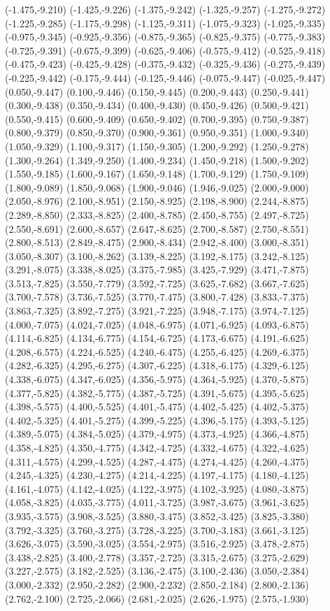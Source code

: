 (-1.475,-9.210) (-1.425,-9.226) (-1.375,-9.242) (-1.325,-9.257) (-1.275,-9.272) (-1.225,-9.285) (-1.175,-9.298) (-1.125,-9.311) (-1.075,-9.323) (-1.025,-9.335) (-0.975,-9.345) (-0.925,-9.356) (-0.875,-9.365) (-0.825,-9.375) (-0.775,-9.383) (-0.725,-9.391) (-0.675,-9.399) (-0.625,-9.406) (-0.575,-9.412) (-0.525,-9.418) (-0.475,-9.423) (-0.425,-9.428) (-0.375,-9.432) (-0.325,-9.436) (-0.275,-9.439) (-0.225,-9.442) (-0.175,-9.444) (-0.125,-9.446) (-0.075,-9.447) (-0.025,-9.447) (0.050,-9.447) (0.100,-9.446) (0.150,-9.445) (0.200,-9.443) (0.250,-9.441) (0.300,-9.438) (0.350,-9.434) (0.400,-9.430) (0.450,-9.426) (0.500,-9.421) (0.550,-9.415) (0.600,-9.409) (0.650,-9.402) (0.700,-9.395) (0.750,-9.387) (0.800,-9.379) (0.850,-9.370) (0.900,-9.361) (0.950,-9.351) (1.000,-9.340) (1.050,-9.329) (1.100,-9.317) (1.150,-9.305) (1.200,-9.292) (1.250,-9.278) (1.300,-9.264) (1.349,-9.250) (1.400,-9.234) (1.450,-9.218) (1.500,-9.202) (1.550,-9.185) (1.600,-9.167) (1.650,-9.148) (1.700,-9.129) (1.750,-9.109) (1.800,-9.089) (1.850,-9.068) (1.900,-9.046) (1.946,-9.025) (2.000,-9.000) (2.050,-8.976) (2.100,-8.951) (2.150,-8.925) (2.198,-8.900) (2.244,-8.875) (2.289,-8.850) (2.333,-8.825) (2.400,-8.785) (2.450,-8.755) (2.497,-8.725) (2.550,-8.691) (2.600,-8.657) (2.647,-8.625) (2.700,-8.587) (2.750,-8.551) (2.800,-8.513) (2.849,-8.475) (2.900,-8.434) (2.942,-8.400) (3.000,-8.351) (3.050,-8.307) (3.100,-8.262) (3.139,-8.225) (3.192,-8.175) (3.242,-8.125) (3.291,-8.075) (3.338,-8.025) (3.375,-7.985) (3.425,-7.929) (3.471,-7.875) (3.513,-7.825) (3.550,-7.779) (3.592,-7.725) (3.625,-7.682) (3.667,-7.625) (3.700,-7.578) (3.736,-7.525) (3.770,-7.475) (3.800,-7.428) (3.833,-7.375) (3.863,-7.325) (3.892,-7.275) (3.921,-7.225) (3.948,-7.175) (3.974,-7.125) (4.000,-7.075) (4.024,-7.025) (4.048,-6.975) (4.071,-6.925) (4.093,-6.875) (4.114,-6.825) (4.134,-6.775) (4.154,-6.725) (4.173,-6.675) (4.191,-6.625) (4.208,-6.575) (4.224,-6.525) (4.240,-6.475) (4.255,-6.425) (4.269,-6.375) (4.282,-6.325) (4.295,-6.275) (4.307,-6.225) (4.318,-6.175) (4.329,-6.125) (4.338,-6.075) (4.347,-6.025) (4.356,-5.975) (4.364,-5.925) (4.370,-5.875) (4.377,-5.825) (4.382,-5.775) (4.387,-5.725) (4.391,-5.675) (4.395,-5.625) (4.398,-5.575) (4.400,-5.525) (4.401,-5.475) (4.402,-5.425) (4.402,-5.375) (4.402,-5.325) (4.401,-5.275) (4.399,-5.225) (4.396,-5.175) (4.393,-5.125) (4.389,-5.075) (4.384,-5.025) (4.379,-4.975) (4.373,-4.925) (4.366,-4.875) (4.358,-4.825) (4.350,-4.775) (4.342,-4.725) (4.332,-4.675) (4.322,-4.625) (4.311,-4.575) (4.299,-4.525) (4.287,-4.475) (4.274,-4.425) (4.260,-4.375) (4.245,-4.325) (4.230,-4.275) (4.214,-4.225) (4.197,-4.175) (4.180,-4.125) (4.161,-4.075) (4.142,-4.025) (4.122,-3.975) (4.102,-3.925) (4.080,-3.875) (4.058,-3.825) (4.035,-3.775) (4.011,-3.725) (3.987,-3.675) (3.961,-3.625) (3.935,-3.575) (3.908,-3.525) (3.880,-3.475) (3.852,-3.425) (3.825,-3.380) (3.792,-3.325) (3.760,-3.275) (3.728,-3.225) (3.700,-3.183) (3.661,-3.125) (3.626,-3.075) (3.590,-3.025) (3.554,-2.975) (3.516,-2.925) (3.478,-2.875) (3.438,-2.825) (3.400,-2.778) (3.357,-2.725) (3.315,-2.675) (3.275,-2.629) (3.227,-2.575) (3.182,-2.525) (3.136,-2.475) (3.100,-2.436) (3.050,-2.384) (3.000,-2.332) (2.950,-2.282) (2.900,-2.232) (2.850,-2.184) (2.800,-2.136) (2.762,-2.100) (2.725,-2.066) (2.681,-2.025) (2.626,-1.975) (2.575,-1.930) 